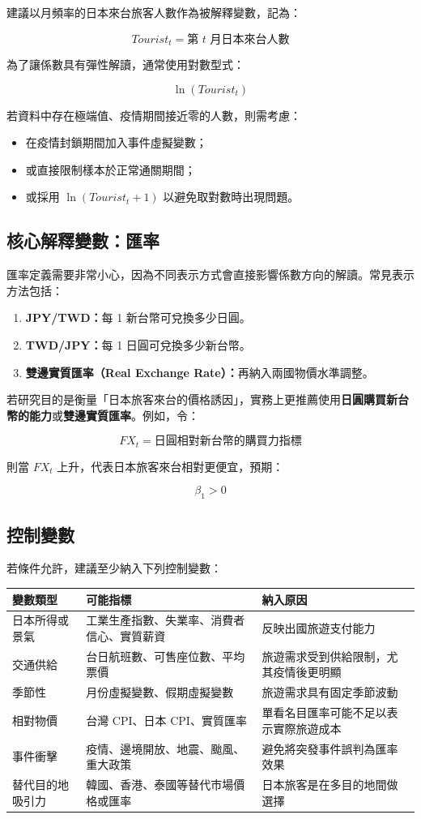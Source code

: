 \documentclass[12pt,a4paper,fontset=none]{ctexart}
\begin{document}
建議以月頻率的日本來台旅客人數作為被解釋變數，記為：

\[
Tourist_t = \text{第 } t \text{ 月日本來台人數}
\]

為了讓係數具有彈性解讀，通常使用對數型式：

\[
\ln(Tourist_t)
\]

若資料中存在極端值、疫情期間接近零的人數，則需考慮：

\begin{itemize}
  \item 在疫情封鎖期間加入事件虛擬變數；
  \item 或直接限制樣本於正常通關期間；
  \item 或採用 $\ln(Tourist_t + 1)$ 以避免取對數時出現問題。
\end{itemize}

\subsection{核心解釋變數：匯率}

匯率定義需要非常小心，因為不同表示方式會直接影響係數方向的解讀。常見表示方法包括：

\begin{enumerate}
  \item \textbf{JPY/TWD：}每 1 新台幣可兌換多少日圓。
  \item \textbf{TWD/JPY：}每 1 日圓可兌換多少新台幣。
  \item \textbf{雙邊實質匯率（Real Exchange Rate）：}再納入兩國物價水準調整。
\end{enumerate}

若研究目的是衡量「日本旅客來台的價格誘因」，實務上更推薦使用\textbf{日圓購買新台幣的能力}或\textbf{雙邊實質匯率}。例如，令：

\[
FX_t = \text{日圓相對新台幣的購買力指標}
\]

則當 $FX_t$ 上升，代表日本旅客來台相對更便宜，預期：

\[
\beta_1 > 0
\]

\subsection{控制變數}

若條件允許，建議至少納入下列控制變數：

\begin{longtable}{p{3.3cm}p{4.8cm}p{6.4cm}}
\toprule
變數類型 & 可能指標 & 納入原因 \\
\midrule
日本所得或景氣 & 工業生產指數、失業率、消費者信心、實質薪資 & 反映出國旅遊支付能力 \\
交通供給 & 台日航班數、可售座位數、平均票價 & 旅遊需求受到供給限制，尤其疫情後更明顯 \\
季節性 & 月份虛擬變數、假期虛擬變數 & 旅遊需求具有固定季節波動 \\
相對物價 & 台灣 CPI、日本 CPI、實質匯率 & 單看名目匯率可能不足以表示實際旅遊成本 \\
事件衝擊 & 疫情、邊境開放、地震、颱風、重大政策 & 避免將突發事件誤判為匯率效果 \\
替代目的地吸引力 & 韓國、香港、泰國等替代市場價格或匯率 & 日本旅客是在多目的地間做選擇 \\
\bottomrule
\end{longtable}
\end{document}
